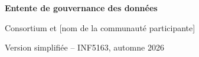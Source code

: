 \documentclass[12pt,letterpaper]{article}
\begin{document}
\begin{center}
  {\Large\bfseries Entente de gouvernance des données\par}
  \vspace{0.3cm}
  {\large Consortium \fedesante{} et [nom de la communauté participante]\par}
  \vspace{0.2cm}
  {\small Version simplifiée -- INF5163, automne 2026\par}
\end{center}



% 
% 
\end{document}
